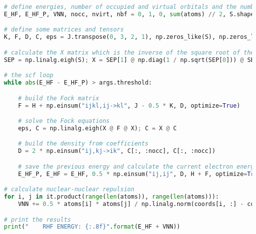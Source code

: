 \raggedbottom\begin{lstlisting}[language=Python, caption={\acrshort{hf} method exercise code solution.}, label=code:hf_solution]
# define energies, number of occupied and virtual orbitals and the number of basis functions
E_HF, E_HF_P, VNN, nocc, nvirt, nbf = 0, 1, 0, sum(atoms) // 2, S.shape[0] - sum(atoms) // 2, S.shape[0]

# define some matrices and tensors
K, F, D, C, eps = J.transpose(0, 3, 2, 1), np.zeros_like(S), np.zeros_like(S), np.zeros_like(S), np.array(nbf * [0])

# calculate the X matrix which is the inverse of the square root of the overlap matrix
SEP = np.linalg.eigh(S); X = SEP[1] @ np.diag(1 / np.sqrt(SEP[0])) @ SEP[1].T

# the scf loop
while abs(E_HF - E_HF_P) > args.threshold:

    # build the Fock matrix
    F = H + np.einsum("ijkl,ij->kl", J - 0.5 * K, D, optimize=True)

    # solve the Fock equations
    eps, C = np.linalg.eigh(X @ F @ X); C = X @ C

    # build the density from coefficients
    D = 2 * np.einsum("ij,kj->ik", C[:, :nocc], C[:, :nocc])

    # save the previous energy and calculate the current electron energy
    E_HF_P, E_HF = E_HF, 0.5 * np.einsum("ij,ij", D, H + F, optimize=True)

# calculate nuclear-nuclear repulsion
for i, j in it.product(range(len(atoms)), range(len(atoms))):
    VNN += 0.5 * atoms[i] * atoms[j] / np.linalg.norm(coords[i, :] - coords[j, :]) if i != j else 0

# print the results
print("    RHF ENERGY: {:.8f}".format(E_HF + VNN))
\end{lstlisting}

